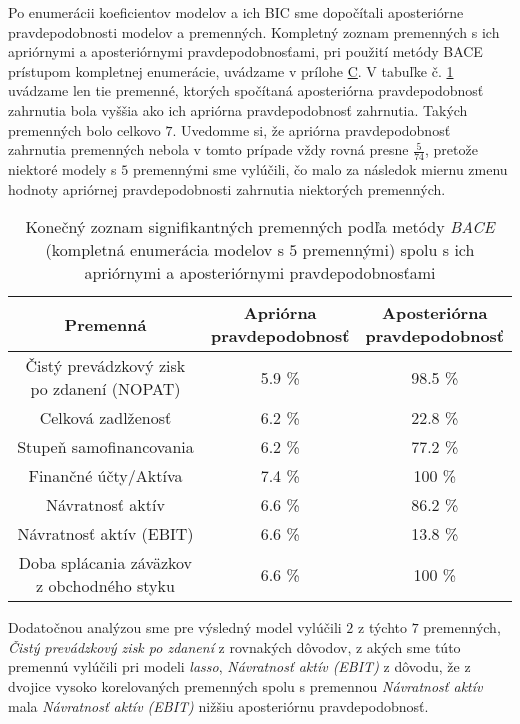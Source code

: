 Po enumerácii koeficientov modelov a ich BIC sme dopočítali aposteriórne pravdepodobnosti modelov a premenných.
Kompletný zoznam premenných s ich apriórnymi a aposteriórnymi pravdepodobnosťami, pri použití metódy BACE prístupom kompletnej enumerácie, uvádzame v prílohe \hyperref[appendix:c]{C}.
V tabuľke č. \ref{bace1 tabulka pp} uvádzame len tie premenné, ktorých spočítaná aposteriórna pravdepodobnosť zahrnutia bola vyššia ako ich apriórna pravdepodobnosť zahrnutia.
Takých premenných bolo celkovo \(7\).
Uvedomme si, že apriórna pravdepodobnosť zahrnutia premenných nebola v tomto prípade vždy rovná presne \(\frac{5}{74}\),
pretože niektoré modely s \(5\) premennými sme vylúčili, čo malo za následok miernu zmenu hodnoty apriórnej pravdepodobnosti zahrnutia niektorých premenných.

\begin{table}
    \begin{tabular}{ |c|c|c| }
        \hline
        Premenná & \makecell{Apriórna \\ pravdepodobnosť} & \makecell{Aposteriórna \\ pravdepodobnosť} \\
        \hline
        Čistý prevádzkový zisk po zdanení (NOPAT) & 5.9 \% & 98.5 \% \\
        \hline
        Celková zadlženosť & 6.2 \% & 22.8 \% \\
        \hline
        Stupeň samofinancovania & 6.2 \% & 77.2 \% \\
        \hline
        Finančné účty/Aktíva & 7.4 \% & 100 \% \\
        \hline
        Návratnosť aktív & 6.6 \% & 86.2 \%\\
        \hline
        Návratnosť aktív (EBIT) & 6.6 \% & 13.8 \% \\
        \hline
        Doba splácania záväzkov z obchodného styku & 6.6 \% & 100 \% \\
        \hline
    \end{tabular}
    \caption{Konečný zoznam signifikantných premenných podľa metódy \emph{BACE} (kompletná enumerácia modelov s \(5\) premennými) spolu s ich apriórnymi a aposteriórnymi pravdepodobnosťami}
    \label{bace1 tabulka pp}
\end{table}

Dodatočnou analýzou sme pre výsledný model vylúčili \(2\) z týchto \(7\) premenných, \emph{Čistý prevádzkový zisk po zdanení} z rovnakých dôvodov,
z akých sme túto premennú vylúčili pri modeli \emph{lasso}, \emph{Návratnosť aktív (EBIT)} z dôvodu,
že z dvojice vysoko korelovaných premenných spolu s premennou \emph{Návratnosť aktív} mala \emph{Návratnosť aktív (EBIT)} nižšiu aposteriórnu pravdepodobnosť.

